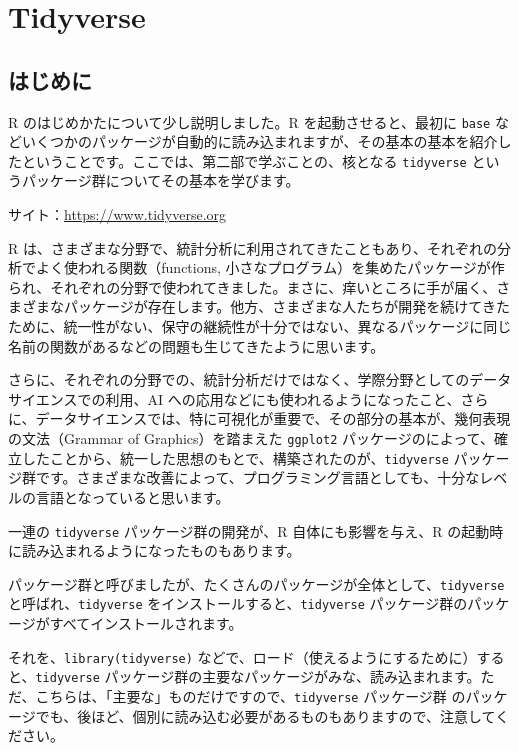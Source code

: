 \documentclass[
  xelatex, ja=standard]{bxjsbook}
\theoremstyle{definition}
\theoremstyle{definition}
\theoremstyle{definition}
\theoremstyle{definition}
\theoremstyle{remark}
\begin{document}
\hypertarget{tidyverse}{%
\chapter{Tidyverse}\label{tidyverse}}

\hypertarget{ux306fux3058ux3081ux306b-2}{%
\section{はじめに}\label{ux306fux3058ux3081ux306b-2}}

R のはじめかたについて少し説明しました。R を起動させると、最初に \texttt{base} などいくつかのパッケージが自動的に読み込まれますが、その基本の基本を紹介したということです。ここでは、第二部で学ぶことの、核となる \texttt{tidyverse} というパッケージ群についてその基本を学びます。

サイト：\url{https://www.tidyverse.org}

R は、さまざまな分野で、統計分析に利用されてきたこともあり、それぞれの分析でよく使われる関数（functions, 小さなプログラム）を集めたパッケージが作られ、それぞれの分野で使われてきました。まさに、痒いところに手が届く、さまざまなパッケージが存在します。他方、さまざまな人たちが開発を続けてきたために、統一性がない、保守の継続性が十分ではない、異なるパッケージに同じ名前の関数があるなどの問題も生じてきたように思います。

さらに、それぞれの分野での、統計分析だけではなく、学際分野としてのデータサイエンスでの利用、AI への応用などにも使われるようになったこと、さらに、データサイエンスでは、特に可視化が重要で、その部分の基本が、幾何表現の文法（Grammar of Graphics）を踏まえた \texttt{ggplot2} パッケージのによって、確立したことから、統一した思想のもとで、構築されたのが、\texttt{tidyverse} パッケージ群です。さまざまな改善によって、プログラミング言語としても、十分なレベルの言語となっていると思います。

一連の \texttt{tidyverse} パッケージ群の開発が、R 自体にも影響を与え、R の起動時に読み込まれるようになったものもあります。

パッケージ群と呼びましたが、たくさんのパッケージが全体として、\texttt{tidyverse} と呼ばれ、\texttt{tidyverse} をインストールすると、\texttt{tidyverse} パッケージ群のパッケージがすべてインストールされます。

それを、\texttt{library(tidyverse)} などで、ロード（使えるようにするために）すると、\texttt{tidyverse} パッケージ群の主要なパッケージがみな、読み込まれます。ただ、こちらは、「主要な」ものだけですので、\texttt{tidyverse} パッケージ群 のパッケージでも、後ほど、個別に読み込む必要があるものもありますので、注意してください。
\end{document}
